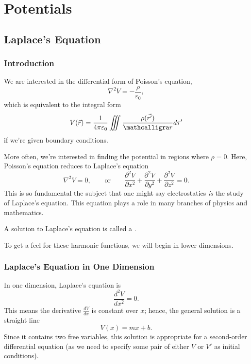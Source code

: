 \chapter{Potentials}\label{potentials}

\section{Laplace's Equation}

\subsection{Introduction}

We are interested in the differential form of Poisson's equation,
\[\nabla^2V=-\frac{\rho}{\varepsilon_0},\]
which is equivalent to the integral form
\[V(\vec{r})=\frac{1}{4\pi\varepsilon_0}\iiint\frac{\rho(\vec{r'})}{\scr}d\tau'\]
if we're given boundary conditions.

More often, we're interested in finding the potential in regions where $\rho=0$. Here, Poisson's equation reduces to Laplace's equation
\[\nabla^2V=0,\qquad\text{or}\qquad \frac{\partial^2V}{\partial x^2}+\frac{\partial^2V}{\partial y^2}+\frac{\partial^2V}{\partial z^2}=0.\]
This is so fundamental the subject that one might say electrostatics \textit{is} the study of Laplace's equation. This equation plays a role in many branches of physics and mathematics.

\begin{definition}
A solution to Laplace's equation is called a .
\end{definition}

To get a feel for these harmonic functions, we will begin in lower dimensions.

\subsection{Laplace's Equation in One Dimension}

In one dimension, Laplace's equation is
\[\frac{d^2V}{dx^2}=0.\]
This means the derivative $\frac{dV}{dx}$ is constant over $x$; hence, the general solution is a straight line
\[V(x)=mx+b.\]
Since it contains two free variables, this solution is appropriate for a second-order differential equation (as we need to specify some pair of either $V$ or $V'$ as initial conditions).

